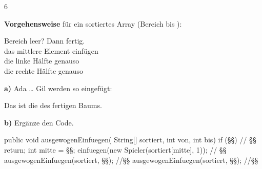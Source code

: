 \documentclass[11pt,a4paper]{article}
\begin{document}
\begin{aufgabe}{6}
\begin{minipage}[t]{0.42\linewidth}
\vspace{0pt}
\textbf{Vorgehensweise} für ein sortiertes Array (Bereich  bis ):\par
{} Bereich leer? Dann fertig.\\
 das mittlere Element einfügen\\
 die linke Hälfte genauso\\
 die rechte Hälfte genauso\par\vspace{1mm}
\begin{lueckentext}
\textbf{a)} Ada … Gil werden so eingefügt:\par{}
Das ist die  des fertigen Baums.
\end{lueckentext}
\end{minipage}\hfill
\begin{minipage}[t]{0.55\linewidth}
\vspace{0pt}
\textbf{b)} Ergänze den Code.\par
\begin{javaluecke}[basicstyle=\linespread{1.5}\footnotesize\ttfamily]
public void ausgewogenEinfuegen(
        String[] sortiert, int von, int bis) {
   if (§§) {           // §§
      return;
   }
   int mitte = §§;
   einfuegen(new Spieler(sortiert[mitte], 1));  // §§
   ausgewogenEinfuegen(sortiert, §§); //§§
   ausgewogenEinfuegen(sortiert, §§); //§§
}
\end{javaluecke}
\end{minipage}
\end{aufgabe}
\end{document}
